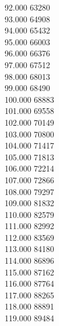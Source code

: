 { 92.000	63280 \\
 93.000	64908 \\
 94.000	65432 \\
 95.000	66003 \\
 96.000	66376 \\
 97.000	67512 \\
 98.000	68013 \\
 99.000	68490 \\
 100.000	68883 \\
 101.000	69558 \\
 102.000	70149 \\
 103.000	70800 \\
 104.000	71417 \\
 105.000	71813 \\
 106.000	72214 \\
 107.000	72866 \\
 108.000	79297 \\
 109.000	81832 \\
 110.000	82579 \\
 111.000	82992 \\
 112.000	83569 \\
 113.000	84180 \\
 114.000	86896 \\
 115.000	87162 \\
 116.000	87764 \\
 117.000	88265 \\
 118.000	88891 \\
 119.000	89484 \\
}
